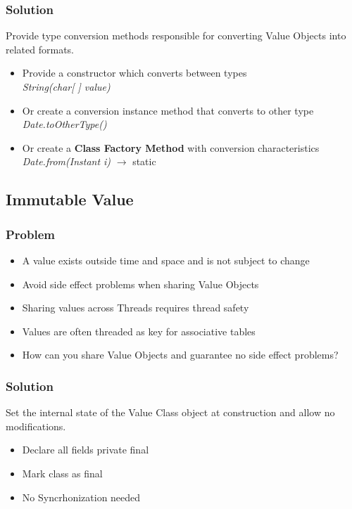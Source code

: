 \subsubsection{Solution}
Provide type conversion methods responsible for converting Value Objects into related formats.
\begin{itemize}[topsep=0pt]
    \itemsep -0.4em
    \item Provide a constructor which converts between types\\\textit{String(char[ ] value)}
    \item Or create a conversion instance method that converts to other type \\\textit{Date.toOtherType()}
    \item Or create a \textbf{Class Factory Method} with conversion characteristics \\\textit{Date.from(Instant i)} $\rightarrow$ static
\end{itemize}

\subsection{Immutable Value}
\subsubsection{Problem}
\begin{itemize}[topsep=0pt]
    \itemsep -0.4em
    \item A value exists outside time and space and is not subject to change
    \item Avoid side effect problems when sharing Value Objects
    \item Sharing values across Threads requires thread safety
    \item Values are often threaded as key for associative tables
    \item How can you share Value Objects and guarantee no side effect problems?
\end{itemize}
\subsubsection{Solution}
Set the internal state of the Value Class object at construction and allow no modifications.
\begin{itemize}[topsep=0pt]
    \itemsep -0.4em
    \item Declare all fields private final
    \item Mark class as final
    \item No Syncrhonization needed
\end{itemize}

